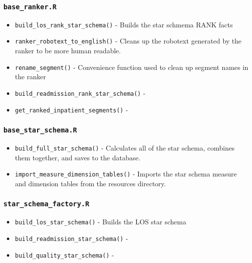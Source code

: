 \documentclass[
]{book}
\providecommand{\tightlist}{%
  \setlength{\itemsep}{0pt}\setlength{\parskip}{0pt}}
\begin{document}
\hypertarget{base_ranker.r}{%
\subsubsection{\texorpdfstring{\texttt{base\_ranker.R}}{base\_ranker.R}}\label{base_ranker.r}}

\begin{itemize}
\tightlist
\item
  \texttt{build\_los\_rank\_star\_schema()} - Builds the star schmema RANK facts
\item
  \texttt{ranker\_robotext\_to\_english()} - Cleans up the robotext generated by the ranker to be more human readable.
\item
  \texttt{rename\_segment()} - Convenience function used to clean up segment names in the ranker
\item
  \texttt{build\_readmission\_rank\_star\_schema()} -
\item
  \texttt{get\_ranked\_inpatient\_segments()} -
\end{itemize}

\hypertarget{base_star_schema.r}{%
\subsubsection{\texorpdfstring{\texttt{base\_star\_schema.R}}{base\_star\_schema.R}}\label{base_star_schema.r}}

\begin{itemize}
\tightlist
\item
  \texttt{build\_full\_star\_schema()} - Calculates all of the star schema, combines them together, and saves to the database.
\item
  \texttt{import\_measure\_dimension\_tables()} - Imports the star schema measure and dimension tables from the resources directory.
\end{itemize}

\hypertarget{star_schema_factory.r}{%
\subsubsection{\texorpdfstring{\texttt{star\_schema\_factory.R}}{star\_schema\_factory.R}}\label{star_schema_factory.r}}

\begin{itemize}
\tightlist
\item
  \texttt{build\_los\_star\_schema()} - Builds the LOS star schema
\item
  \texttt{build\_readmission\_star\_schema()} -
\item
  \texttt{build\_quality\_star\_schema()} -
\end{itemize}
\end{document}
